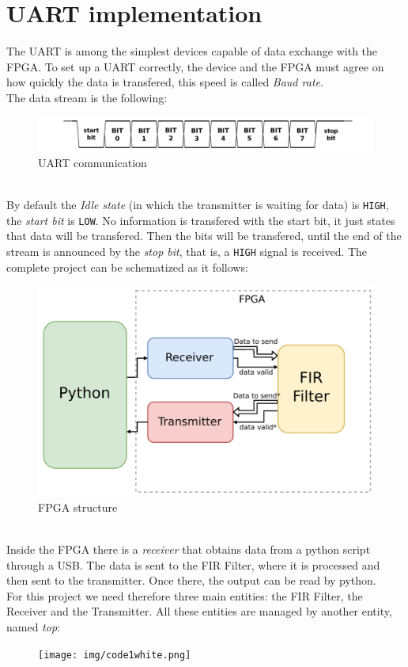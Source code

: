 \documentclass[11pt,a4paper,twocolumn]{IEEEtran}
\begin{document}
	\section{UART implementation}
	The UART is among the simplest devices capable of data exchange with the FPGA.
	To set up a UART correctly, the device and the FPGA must agree on how quickly the data is transfered, this speed is called \emph{Baud rate}.\\
	The data stream is the following:
	\begin{figure}[h]
		\centering
		\includegraphics[width=1\linewidth]{img/UART_timing_diagram}
		\caption{UART communication}
	\end{figure}\\
	By default the \emph{Idle state} (in which the transmitter is waiting for data) is \texttt{HIGH}, the \emph{start bit} is \texttt{LOW}. No information is transfered with the start bit, it just states that data will  be transfered. Then the bits will be transfered, until the end of the stream is announced by the \emph{stop bit}, that is, a \texttt{HIGH} signal is received.\newpage
	The complete project can be schematized as it follows:
	\begin{figure}[h]
		\centering
		\includegraphics[width=1\linewidth]{img/projectcompletepdf}
		\caption{FPGA structure}
		\label{fig:fpgastruct}
	\end{figure}\\
	Inside the FPGA there is a \emph{receiver} that obtains data from a python script through a USB. The data is sent to the FIR Filter, where it is processed and then sent to the transmitter. Once there, the output can be read by python.\\
	For this project we need therefore three main entities: the FIR Filter, the Receiver and the Transmitter. All these entities are managed by another entity, named \emph{top}:
	\begin{figure}[h]
		\centering
		\vspace*{-.4cm}
		\hspace*{-.8cm}\texttt{[image: img/code1white.png]}
	\end{figure}
	\newpage
\end{document}
